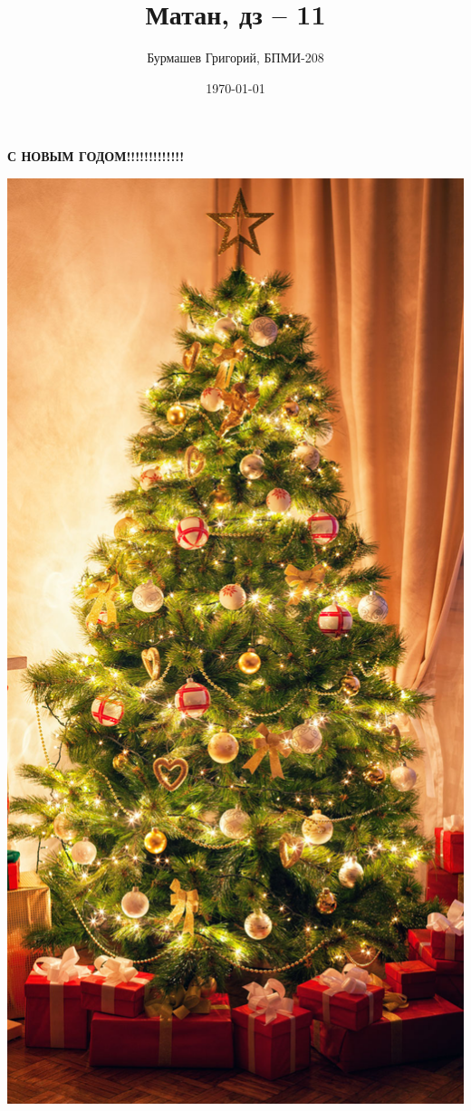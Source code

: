 \documentclass[a4paper,12pt]{article}
\author{Бурмашев Григорий, БПМИ-208}
\title{Матан, дз -- 11 }
\date{\today}
\begin{document}
\maketitle
\begin{center}
\textbf{С НОВЫМ ГОДОМ!!!!!!!!!!!!!}
\end{center}
\begin{center}
\includegraphics[scale=0.3]{5.jpg}
\end{center}
\end{document}
